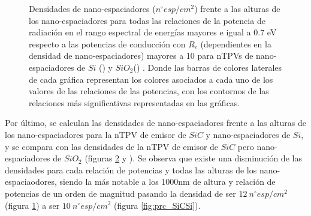 \begin{figure} [H]
\begin{subfigure}[b]{0.48\textwidth}
			\caption{}%
			\label{fig:prc_SiCSiO2}%
	\end{subfigure}
	\caption{Densidades de nano-espaciadores ($n^{\circ}esp/cm^2$) frente a las alturas de los nano-espaciadores para todas las relaciones de la potencia de radiación en el rango espectral de energías mayores e igual a 0.7 eV respecto a las potencias de conducción con $R_c$ (dependientes en la densidad de nano-espaciadores) mayores a 10 para nTPVs de nano-espaciadores de $Si$ () y $SiO_2$() . Donde las barras de colores laterales de cada gráfica representan los colores asociados a cada uno de los valores de las relaciones de las potencias, con los contornos de las relaciones más significativas representadas en las gráficas.}%
	\label{fig:prc_SiCXX}%
\end{figure}
Por último, se calculan las densidades de nano-espaciadores frente a las alturas de los nano-espaciadores para la nTPV de emisor de $SiC$ y nano-espaciadores de $Si$, y se compara con las densidades de la nTPV de emisor de $SiC$ pero nano-espaciadores de $SiO_2$ (figuras \ref{fig:prc_SiCXX}  y ). Se observa que existe una disminución de las densidades para cada relación de potencias y todas las alturas de los nano-espaciaodores, siendo la más notable a los 1000nm de altura y relación de potencias de un orden de magnitud pasando la densidad de ser $12 \ n^{\circ}esp/cm^2$ (figura \ref{fig:prc_SiCSiO2}) a ser $10 \ n^{\circ}esp/cm^2$ (figura \ref{fig:prc_SiCSi}).